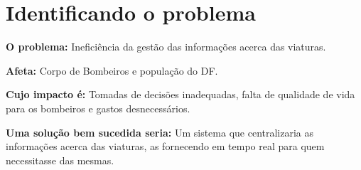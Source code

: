 \chapter{Identificando o problema}

  \textbf{O problema:} Ineficiência da gestão das informações acerca das viaturas.
  
  \textbf{Afeta:} Corpo de Bombeiros e população do DF.
  
  \textbf{Cujo impacto é:} Tomadas de decisões inadequadas, falta de qualidade de vida para os bombeiros e gastos desnecessários.
  
  \textbf{Uma solução bem sucedida seria:} Um sistema que centralizaria as informações acerca das viaturas, as fornecendo 
  em tempo real para quem necessitasse das mesmas.